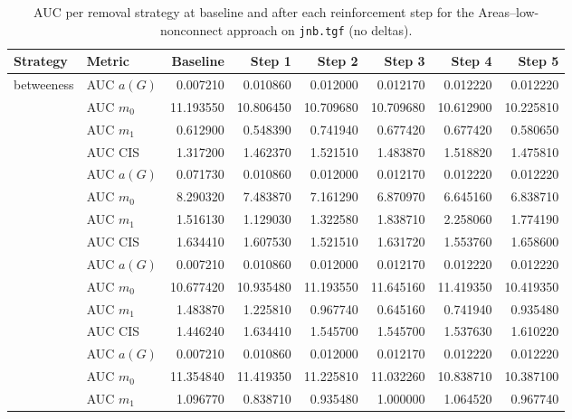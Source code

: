 \begin{table}[htbp]
  \centering
  \caption{AUC per removal strategy at baseline and after each reinforcement step for the Areas–low-nonconnect approach on \texttt{jnb.tgf} (no deltas).}
  \label{tab:jnb-areas_low_nonconnect-auc}
  \begin{tabular}{llrrrrrr}
    \toprule
    \textbf{Strategy} & \textbf{Metric} & \textbf{Baseline} & \textbf{Step 1} & \textbf{Step 2} & \textbf{Step 3} & \textbf{Step 4} & \textbf{Step 5} \\
    \midrule
    \multirow{4}{*}{betweeness} & AUC $a(G)$ & 0.007210 & 0.010860 & 0.012000 & 0.012170 & 0.012220 & 0.012220 \\
    & AUC $m_0$ & 11.193550 & 10.806450 & 10.709680 & 10.709680 & 10.612900 & 10.225810 \\
    & AUC $m_1$ & 0.612900 & 0.548390 & 0.741940 & 0.677420 & 0.677420 & 0.580650 \\
    & AUC CIS & 1.317200 & 1.462370 & 1.521510 & 1.483870 & 1.518820 & 1.475810 \\
    \addlinespace
    \multirow{4}{*}{closeness} & AUC $a(G)$ & 0.071730 & 0.010860 & 0.012000 & 0.012170 & 0.012220 & 0.012220 \\
    & AUC $m_0$ & 8.290320 & 7.483870 & 7.161290 & 6.870970 & 6.645160 & 6.838710 \\
    & AUC $m_1$ & 1.516130 & 1.129030 & 1.322580 & 1.838710 & 2.258060 & 1.774190 \\
    & AUC CIS & 1.634410 & 1.607530 & 1.521510 & 1.631720 & 1.553760 & 1.658600 \\
    \addlinespace
    \multirow{4}{*}{core influence} & AUC $a(G)$ & 0.007210 & 0.010860 & 0.012000 & 0.012170 & 0.012220 & 0.012220 \\
    & AUC $m_0$ & 10.677420 & 10.935480 & 11.193550 & 11.645160 & 11.419350 & 10.419350 \\
    & AUC $m_1$ & 1.483870 & 1.225810 & 0.967740 & 0.645160 & 0.741940 & 0.935480 \\
    & AUC CIS & 1.446240 & 1.634410 & 1.545700 & 1.545700 & 1.537630 & 1.610220 \\
    \addlinespace
    \multirow{4}{*}{degree} & AUC $a(G)$ & 0.007210 & 0.010860 & 0.012000 & 0.012170 & 0.012220 & 0.012220 \\
    & AUC $m_0$ & 11.354840 & 11.419350 & 11.225810 & 11.032260 & 10.838710 & 10.387100 \\
    & AUC $m_1$ & 1.096770 & 0.838710 & 0.935480 & 1.000000 & 1.064520 & 0.967740 \\

\end{tabular}
\end{table}
